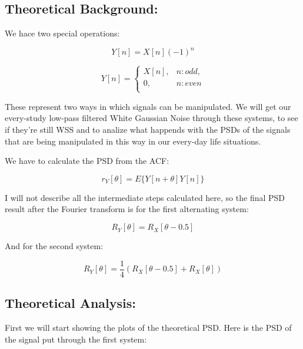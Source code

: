 \documentclass[a4paper,11pt]{article}
\begin{document}
\subsection{Theoretical Background:}

We hace two special operations:

\begin{equation}
  Y[n] = X[n](-1)^n
\end{equation}

\begin{equation}
  Y[n] =
    \begin{cases}
        X[n],& n: odd,\\
        0,    & n: even\\
    \end{cases}
\end{equation}

These represent two ways in which signals can be manipulated. We will get our every-study low-pass filtered White Gaussian Noise through these systems, to see if they're still WSS and to analize what happends with the PSDs of the signals that are being manipulated in this way in our every-day life situations.

We have to calculate the PSD from the ACF:

\begin{equation}
  r_Y[\theta] = E\{Y[n+\theta]Y[n]\}
\end{equation}

I will not describe all the intermediate steps calculated here, so the final PSD result after the Fourier transform is for the first alternating system:

\begin{equation}
  R_Y[\theta] = R_X[\theta-0.5]
\end{equation}

And for the second system:

\begin{equation}
  R_Y[\theta] = \frac{1}{4}(R_X[\theta-0.5] + R_X[\theta])
\end{equation}

\newpage

\subsection{Theoretical Analysis:}

First we will start showing the plots of the theoretical PSD. Here is the PSD of the signal put through the first system:
\end{document}
